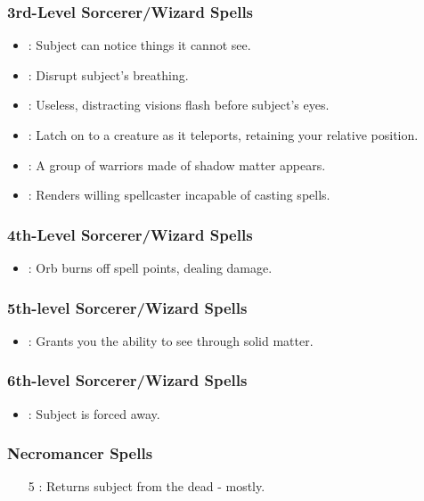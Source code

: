 \subsubsection{3rd-Level Sorcerer/Wizard Spells}
\begin{itemize}
 \item {}: Subject can notice things it cannot see.
 \item {}: Disrupt subject's breathing.
 \item {}: Useless, distracting visions flash before subject's eyes.
 \item {}: Latch on to a creature as it teleports, retaining your relative position.
 \item {}: A group of warriors made of shadow matter appears.
 \item {}: Renders willing spellcaster incapable of casting spells.
\end{itemize}
\subsubsection{4th-Level Sorcerer/Wizard Spells}
\begin{itemize}
 \item {}: Orb burns off spell points, dealing damage.
\end{itemize}
\subsubsection{5th-level Sorcerer/Wizard Spells}
\begin{itemize} 
 \item {}: Grants you the ability to see through solid matter.
\end{itemize}
\subsubsection{6th-level Sorcerer/Wizard Spells}
\begin{itemize}
 \item {}: Subject is forced away.
\end{itemize}

\subsubsection{Necromancer Spells}
\begin{itemize}
 \item[5] : Returns subject from the dead - mostly.
\end{itemize}

